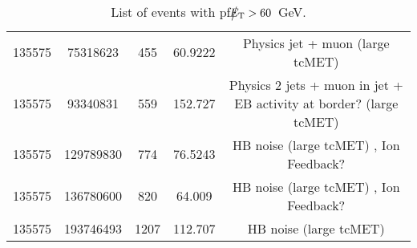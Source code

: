 \begin{table}[htbp]
\begin{center}
\begin{tabular}{|c|c|c|c|c|}
      135575 & 75318623    &  455  &    60.9222  & Physics jet + muon (large tcMET) \\
      135575 & 93340831    &  559  &    152.727  & Physics 2 jets + muon in jet + EB activity at border? (large tcMET) \\
      135575 & 129789830   &  774  &    76.5243  & HB noise (large tcMET) , Ion Feedback? \\
      135575 & 136780600   &  820  &    64.009   & HB noise (large tcMET) , Ion Feedback? \\
      135575 & 193746493   &  1207 &    112.707  & HB noise (large tcMET) \\
      \hline
    \end{tabular}
    \caption{List of events with pf$\big\slash\hspace{-1.6ex}{E_\text{T}}>60$~GeV.}        
    \label{tab:pfMETlist1}
  \end{center}
\end{table}
